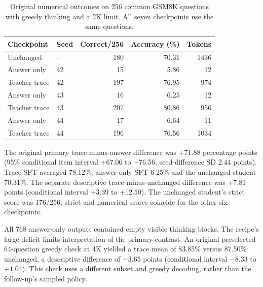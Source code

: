 \par\begin{table}[ht]\centering\small\begin{tabular}{llrrr}\toprule
Checkpoint & Seed & Correct/256 & Accuracy (\%) & Tokens \\
\midrule
Unchanged & -- & 180 & 70.31 & 1436 \\
Answer only & 42 & 15 & 5.86 & 12 \\
Teacher trace & 42 & 197 & 76.95 & 974 \\
Answer only & 43 & 16 & 6.25 & 12 \\
Teacher trace & 43 & 207 & 80.86 & 956 \\
Answer only & 44 & 17 & 6.64 & 11 \\
Teacher trace & 44 & 196 & 76.56 & 1034 \\
\bottomrule\end{tabular}\caption{Original numerical outcomes on 256 common GSM8K questions with greedy thinking and a 2K limit. All seven checkpoints use the same questions.}\label{tab:original}\end{table}\par
The original primary trace-minus-answer difference was +71.88 percentage points (95\% conditional item interval +67.06 to +76.56; seed-difference SD 2.44 points). Trace SFT averaged 78.12\%, answer-only SFT 6.25\% and the unchanged student 70.31\%. The separate descriptive trace-minus-unchanged difference was +7.81 points (conditional interval +3.39 to +12.50). The unchanged student's strict score was 176/256; strict and numerical scores coincide for the other six checkpoints.

All 768 answer-only outputs contained empty visible thinking blocks. The recipe's large deficit limits interpretation of the primary contrast. An original preselected 64-question greedy check at 4K yielded a trace mean of 83.85\% versus 87.50\% unchanged, a descriptive difference of $-3.65$ points (conditional interval $-8.33$ to $+1.04$). This check uses a different subset and greedy decoding, rather than the follow-up's sampled policy.
